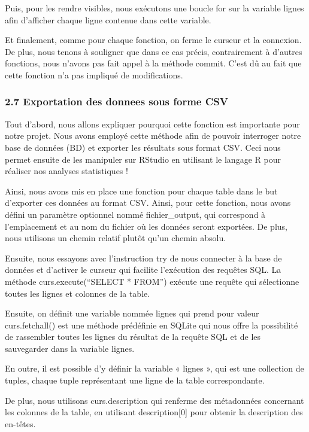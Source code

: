 \documentclass[
]{article}
\begin{document}
Puis, pour les rendre visibles, nous exécutons une boucle for sur la
variable lignes afin d'afficher chaque ligne contenue dans cette
variable.

Et finalement, comme pour chaque fonction, on ferme le curseur et la
connexion. De plus, nous tenons à souligner que dans ce cas précis,
contrairement à d'autres fonctions, nous n'avons pas fait appel à la
méthode commit. C'est dû au fait que cette fonction n'a pas impliqué de
modifications.

\subsubsection{2.7 Exportation des donnees sous forme
CSV}\label{exportation-des-donnees-sous-forme-csv}

Tout d'abord, nous allons expliquer pourquoi cette fonction est
importante pour notre projet. Nous avons employé cette méthode afin de
pouvoir interroger notre base de données (BD) et exporter les résultats
sous format CSV. Ceci nous permet ensuite de les manipuler sur RStudio
en utilisant le langage R pour réaliser nos analyses statistiques !

Ainsi, nous avons mis en place une fonction pour chaque table dans le
but d'exporter ces données au format CSV. Ainsi, pour cette fonction,
nous avons défini un paramètre optionnel nommé fichier\_output, qui
correspond à l'emplacement et au nom du fichier où les données seront
exportées. De plus, nous utilisons un chemin relatif plutôt qu'un chemin
absolu.

Ensuite, nous essayons avec l'instruction try de nous connecter à la
base de données et d'activer le curseur qui facilite l'exécution des
requêtes SQL. La méthode curs.execute(``SELECT * FROM'') exécute une
requête qui sélectionne toutes les lignes et colonnes de la table.

Ensuite, on définit une variable nommée lignes qui prend pour valeur
curs.fetchall() est une méthode prédéfinie en SQLite qui nous offre la
possibilité de rassembler toutes les lignes du résultat de la requête
SQL et de les sauvegarder dans la variable lignes.

En outre, il est possible d'y définir la variable « lignes », qui est
une collection de tuples, chaque tuple représentant une ligne de la
table correspondante.

De plus, nous utilisons curs.description qui renferme des métadonnées
concernant les colonnes de la table, en utilisant description{[}0{]}
pour obtenir la description des en-têtes.
\end{document}

